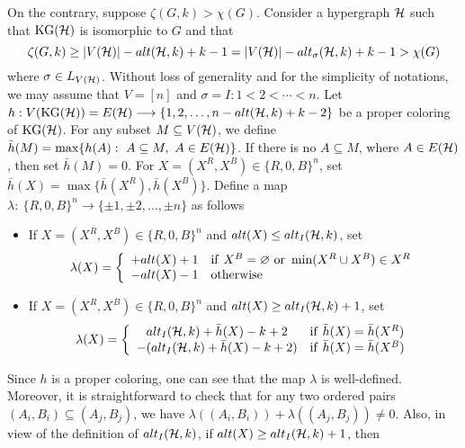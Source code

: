 \documentclass[11pt]{article}
\begin{document}


On the contrary, suppose $\zeta(G,k) > \chi(G)$. Consider a hypergraph
${\cal H}$ such that ${\rm KG}({\cal H})$ is isomorphic to $G$ and that
$$\zeta(G,k)\geq  |V({\cal H})|-alt({\cal H},k)+k-1=|V({\cal H})|-alt_\sigma({\cal H},k)+k-1> \chi(G)$$
where $\sigma\in L_{V({\cal H})}$.
Without loss of generality and for the simplicity of notations, we may assume that
$V=[n]$ and $\sigma=I:1<2<\cdots<n$.
Let  $h: V({\rm KG}({\cal H}))=E({\cal H}) \longrightarrow \{1,2,\ldots, n-alt({\cal H},k)+k-2\}$ be a proper coloring of
${\rm KG}({\cal H})$. For any subset $M\subseteq V({\cal H})$, we define $\bar{h}(M)=\max\{h(A):\ A\subseteq M,\ A\in E({\cal H})\}$. If there is no $A\subseteq M$, where $A\in E({\cal H})$,
then set $\bar{h}(M)=0$.
For $X=(X^R,X^B)\in \{R,0,B\}^n$, set $\bar{h}(X)=\max\{\bar{h}(X^R),\bar{h}(X^B)\}$.
Define a map $\lambda:\ \{R,0,B\}^n \longrightarrow \{\pm1,\pm2,\ldots,\pm n\}$ as follows
\begin{itemize}
\item If $X=(X^R,X^B)\in \{R,0,B\}^n$ and
      $alt(X)\leq alt_{I}({\cal H},k)$, set
$$
\lambda(X)=\left\{
\begin{array}{cl}
+alt(X)+1 & {\rm if}\ X^B=\varnothing \ {\rm or}\ \min (X^R \cup X^B)\in X^R\\
-alt(X)-1   & {\rm otherwise}
\end{array}\right.
$$
\item If $X=(X^R,X^B)\in \{R,0,B\}^n$ and
      $alt(X)\geq alt_{I}({\cal H},k)+1$, set
$$
\lambda(X)=\left\{
\begin{array}{cl}
alt_{I}({\cal H},k)+\bar{h}(X)-k+2 & {\rm if}\ \bar{h}(X)=\bar{h}(X^R)\\
-(alt_{I}({\cal H},k)+\bar{h}(X)-k+2) & {\rm if}\  \bar{h}(X)=\bar{h}(X^B)
\end{array}\right.
$$
\end{itemize}
Since $h$ is a proper coloring, one can see that the map $\lambda$ is well-defined. Moreover,
it is straightforward to check that for any two ordered pairs $(A_i, B_i)\subseteq (A_j, B_j)$, we have
$\lambda((A_i, B_i))+\lambda((A_j, B_j))\not =0$. Also,
in view of the definition of $alt_{I}({\cal H},k)$,  if $alt(X)\geq alt_{I}({\cal H},k)+1$, then
\end{document}
